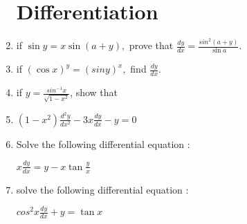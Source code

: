 \documentclass{article}
\begin{document}
\begin{enumerate}


\section*{Differentiation}
    \item if $\sin y = x \sin(a + y),$ prove that $\frac{dy}{dx} = \frac{sin^2(a+y)}{\sin a}.$
    \item if $(\cos x)^y = (sin y)^x, $ find $\frac{dy}{dx}.$
    \item if $y = \frac{sin^{-1} x}{\sqrt{1-x^2}}$, show that
    \item $(1 - x^2)\frac{d^2{y}}{dx^2}-3x\frac{dy}{dx} - y = 0$
    \item Solve the following differential equation :
    
    \hspace{20pt} $x \frac{dy}{dx} = y - x \tan \frac{y}{x}$

    \item solve the following differential equation :

    \hspace{20pt} ${cos^{2}} {x} \frac{dy}{dx} + y = \tan x$


    
\end{enumerate}
\end{document}
